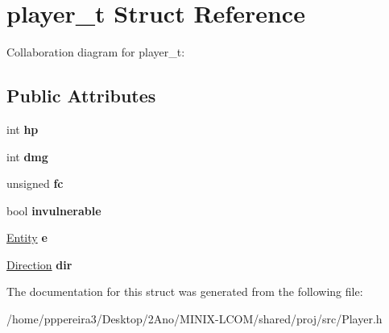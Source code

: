 \hypertarget{structplayer__t}{}\section{player\+\_\+t Struct Reference}
\label{structplayer__t}


Collaboration diagram for player\+\_\+t\+:
\subsection*{Public Attributes}
\begin{DoxyCompactItemize}
\item 
int {\bfseries hp}
\item 
int {\bfseries dmg}
\item 
unsigned {\bfseries fc}
\item 
bool {\bfseries invulnerable}
\item 
\hyperlink{structentity__t}{Entity} {\bfseries e}
\item 
\hyperlink{structdirection__t}{Direction} {\bfseries dir}
\end{DoxyCompactItemize}


The documentation for this struct was generated from the following file\+:\begin{DoxyCompactItemize}
\item 
/home/pppereira3/\+Desktop/2\+Ano/\+M\+I\+N\+I\+X-\/\+L\+C\+O\+M/shared/proj/src/Player.\+h\end{DoxyCompactItemize}
